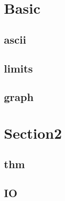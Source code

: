 \section{Basic}
    \subsection{ascii}
        
    \subsection{limits}
            
    \subsection{graph}
        

\section{Section2}
    \subsection{thm}
        
    \subsection{IO}
        